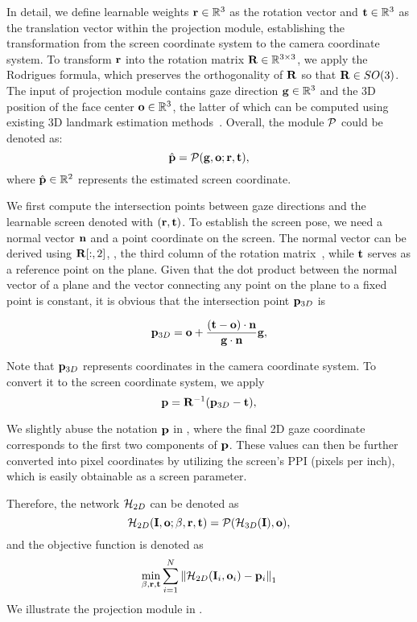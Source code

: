 In detail, we define learnable weights $\mathbf{r}\in\mathbb{R}^3$ as the rotation vector and $\mathbf{t}\in\mathbb{R}^3$ as the translation vector within the projection module,
establishing the transformation from the screen coordinate system to the camera coordinate system.
To transform $\mathbf{r}$ into the rotation matrix $\mathbf{R}\in\mathbb{R}^{3\times3}$, we apply the Rodrigues formula, which preserves the orthogonality of $\mathbf{R}$ so that $\mathbf{R} \in SO(3)$.
The input of projection module contains gaze direction $\mathbf{g}\in\mathbb{R}^3$ and the 3D position of the face center $\mathbf{o}\in\mathbb{R}^3$, the latter of which can be computed using existing 3D landmark estimation methods~\cite{Guo_2020_ECCV}. Overall, the module $\mathcal{P}$ could be denoted as:
\begin{equation}
    \hat{\mathbf{p}} = \mathcal{P}(\mathbf{g}, \mathbf{o}; \mathbf{r}, \mathbf{t}), 
\end{equation}
\noindent where $\hat{\mathbf{p}}\in\mathbb{R}^2$ represents the estimated screen coordinate. 

We first compute the intersection points between gaze directions and the learnable screen denoted with $(\mathbf{r}, \mathbf{t})$. To establish the screen pose, we need a normal vector $\mathbf{n}$ and a point coordinate on the screen. The normal vector can be derived using $\mathbf{R}[:,2]$, \ie, the third column of the rotation matrix~\cite{Cheng_2024_pami}, while $\mathbf{t}$ serves as a reference point on the plane. 
Given that the dot product between the normal vector of a plane and the vector connecting any point on the plane to a fixed point is constant, it is obvious that the intersection point $\mathbf{p}_{3D}$ is

\begin{equation}
    \mathbf{p}_{3D} = \mathbf{o} + \frac{(\mathbf{t} - \mathbf{o})\cdot{\mathbf{n}}}{\mathbf{g}\cdot{\mathbf{n}}} \mathbf{g},
\end{equation}

Note that $\mathbf{p}_{3D}$ represents coordinates in the camera coordinate system. To convert it to the screen coordinate system, we apply
\begin{equation}
    \mathbf{p} = \mathbf{R}^{-1}(\mathbf{p}_{3D} - \mathbf{t}),
    \label{equ:rot}
\end{equation}

\noindent We slightly abuse the notation $\mathbf{p}$ in , where the final 2D gaze coordinate corresponds to the first two components of $\mathbf{p}$. These values can then be further converted into pixel coordinates by utilizing the screen's PPI (pixels per inch), which is easily obtainable as a screen parameter.

Therefore, the network $\mathcal{H}_{2D}$ can be denoted as 
\begin{equation}
    \mathcal{H}_{2D}(\mathbf{I}, \mathbf{o}; \beta, \mathbf{r}, \mathbf{t}) = \mathcal{P}(\mathcal{H}_{3D}(\mathbf{I}), \mathbf{o}),
\end{equation}
\noindent and the objective function is denoted as 
\begin{equation}
    \min_{\beta, \mathbf{r}, \mathbf{t}} \sum_{i=1}^{N}\left\|\mathcal{H}_{2D}(\mathbf{I}_i, \mathbf{o}_i) - \mathbf{p}_i\right\|_1  
    \label{equ:loss1}
\end{equation}
\noindent We illustrate the projection module in .


